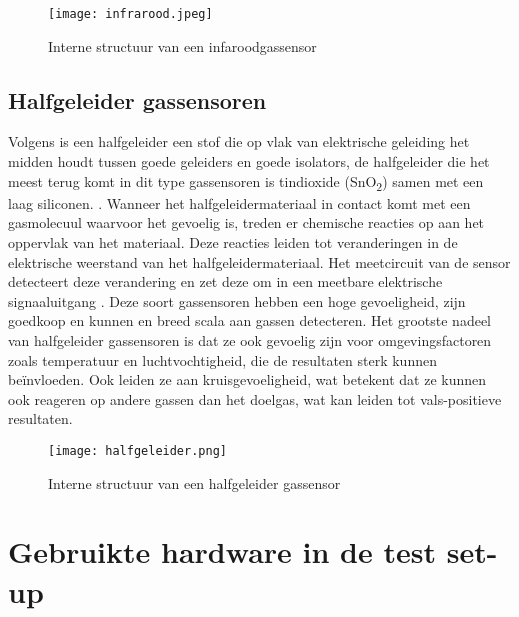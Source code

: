\begin{figure}[h]
    \texttt{[image: infrarood.jpeg]}
    \caption[Structuur infraroodgassensor]{Interne structuur van een infaroodgassensor
    }
    \label{fig:infrarood}
\end{figure}


\subsection{Halfgeleider gassensoren}
\label{subsec:MOS}

Volgens
is een halfgeleider een stof die op vlak van elektrische geleiding het midden houdt tussen goede geleiders en goede isolators, de halfgeleider die het meest terug komt in dit type gassensoren is tindioxide (SnO\textsubscript{2}) samen met een laag siliconen.
. Wanneer het halfgeleidermateriaal in contact komt met een gasmolecuul waarvoor het gevoelig is, treden er chemische reacties op aan het oppervlak van het materiaal. Deze reacties leiden tot veranderingen in de elektrische weerstand van het halfgeleidermateriaal. Het meetcircuit van de sensor detecteert deze verandering en zet deze om in een meetbare elektrische signaaluitgang
. Deze soort gassensoren hebben een hoge gevoeligheid, zijn goedkoop en kunnen en breed scala aan gassen detecteren. Het grootste nadeel van halfgeleider gassensoren is dat ze ook gevoelig zijn voor omgevingsfactoren zoals temperatuur en luchtvochtigheid, die de resultaten sterk kunnen beïnvloeden. Ook leiden ze aan kruisgevoeligheid, wat betekent dat ze kunnen ook reageren op andere gassen dan het doelgas, wat kan leiden tot vals-positieve resultaten.


\begin{figure}[h]
    \texttt{[image: halfgeleider.png]}
    \caption[Structuur halfgeleider gassensor]{Interne structuur van een halfgeleider gassensor
    }
    \label{fig:halfgeleider}
\end{figure}



\section{Gebruikte hardware in de test set-up}
\label{sec:hardware}


